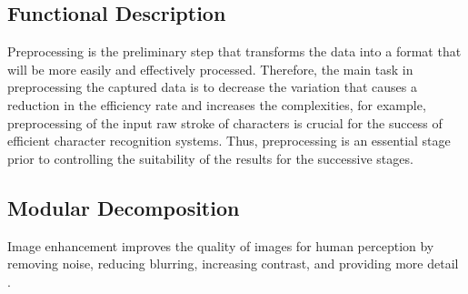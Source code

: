 \subsection{Functional Description}
Preprocessing is the preliminary step that transforms the data into a format that will be more easily and effectively processed. Therefore, the main task in preprocessing the captured data is to decrease the variation that causes a reduction in the efficiency  rate and increases the complexities, for example, preprocessing of the input raw stroke of characters is crucial for the success of efficient character recognition systems. Thus, preprocessing is an essential stage prior to controlling the suitability of the results for the successive stages. 


\subsection{Modular Decomposition}
Image enhancement improves the quality of images for human perception by removing noise, reducing blurring, increasing contrast, and providing more detail \cite{inbook}. 

